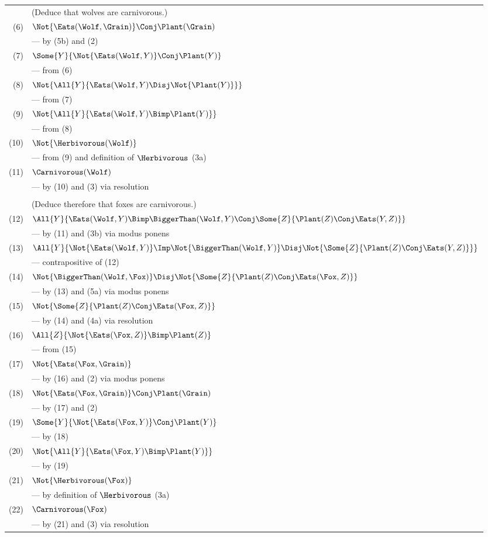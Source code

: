 \begin{tabular}{rl}
& (Deduce that wolves are carnivorous.) \\
(6) & $\Not{\Eats(\Wolf, \Grain)} \Conj \Plant(\Grain)$
\\ & --- by (5b) and (2) \\
(7) & $\Some{Y}{\Not{\Eats(\Wolf, Y)} \Conj \Plant(Y)}$
\\ & --- from (6) \\
(8) & $\Not{\All{Y}{\Eats(\Wolf, Y) \Disj \Not{\Plant(Y)}}}$
\\ & --- from (7) \\
(9) & $\Not{\All{Y}{\Eats(\Wolf, Y) \Bimp \Plant(Y)}}$
\\ & --- from (8) \\
(10) & $\Not{\Herbivorous(\Wolf)}$
\\ & --- from (9) and definition of $\Herbivorous$ (3a) \\
(11) & $\Carnivorous(\Wolf)$
\\ & --- by (10) and (3) via resolution \\
\\
& (Deduce therefore that foxes are carnivorous.) \\
(12) & $\All{Y}{\Eats(\Wolf, Y) \Bimp
            \BiggerThan(\Wolf, Y) \Conj
            \Some{Z}{\Plant(Z) \Conj \Eats(Y, Z)}}$
\\ & --- by (11) and (3b) via modus ponens \\
(13) & $\All{Y}{\Not{\Eats(\Wolf, Y)} \Imp
            \Not{\BiggerThan(\Wolf, Y)} \Disj
            \Not{\Some{Z}{\Plant(Z) \Conj \Eats(Y, Z)}}}$
\\ & --- contrapositive of (12) \\
(14) & $\Not{\BiggerThan(\Wolf, \Fox)} \Disj
            \Not{\Some{Z}{\Plant(Z) \Conj \Eats(\Fox, Z)}}$
\\ & --- by (13) and (5a) via modus ponens \\
(15) & $\Not{\Some{Z}{\Plant(Z) \Conj \Eats(\Fox, Z)}}$
\\ & --- by (14) and (4a) via resolution \\
(16) & $\All{Z}{\Not{\Eats(\Fox, Z)} \Bimp \Plant(Z)}$
\\ & --- from (15) \\
(17) & $\Not{\Eats(\Fox, \Grain)}$
\\ & --- by (16) and (2) via modus ponens \\
(18) & $\Not{\Eats(\Fox, \Grain)} \Conj \Plant(\Grain)$
\\ & --- by (17) and (2) \\
(19) & $\Some{Y}{\Not{\Eats(\Fox, Y)} \Conj \Plant(Y)}$
\\ & --- by (18) \\
(20) & $\Not{\All{Y}{\Eats(\Fox, Y) \Bimp \Plant(Y)}}$
\\ & --- by (19) \\
(21) & $\Not{\Herbivorous(\Fox)}$
\\ & --- by definition of $\Herbivorous$ (3a) \\
(22) & $\Carnivorous(\Fox)$
\\ & --- by (21) and (3) via resolution \\
\end{tabular}

